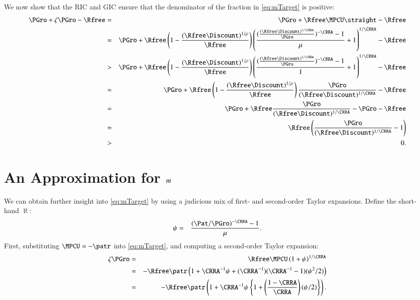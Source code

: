 We now show that the RIC and GIC ensure that the denominator of the fraction in \eqref{eq:mTarget} is positive:
\begin{eqnarray*}
\PGro + \zeta \PGro - \Rfree & = & \PGro + \Rfree \MPCU \straight - \Rfree
 \\& = & \PGro + \Rfree \left(1- \frac{(\Rfree \Discount)^{1/\rho}}{\Rfree}\right) \left(\frac{(\frac{(\Rfree\Discount)^{1/\CRRA}}{\PGro})^{-\CRRA}-1}{\urate}+1\right)^{1/\CRRA}-\Rfree
 \\& > &  \PGro+\Rfree \left(1-\frac{(\Rfree\Discount)^{1/\rho}}{\Rfree}\right)
\left(\frac{(\frac{(\Rfree\Discount)^{1/\CRRA}}{\PGro})^{-\CRRA}-1}{1}+1\right)^{1/\CRRA}-\Rfree
 \\& = & \PGro+\Rfree\left(1-\frac{(\Rfree\Discount)^{1/\rho}}{\Rfree}\right)\frac{\PGro}{(\Rfree\Discount)^{1/\CRRA}}-\Rfree
 \\& = & \PGro+\Rfree \frac{\PGro}{(\Rfree\Discount)^{1/\CRRA}}- \PGro - \Rfree
 \\& = & \Rfree \left(\frac{\PGro}{(\Rfree\Discount)^{1/\CRRA}}-1\right)
 \\& > & 0.
\end{eqnarray*}


\section{An Approximation for $\mTarg^{\null}$}
We can obtain further insight into \eqref{eq:mTarget} by using a judicious mix of first- and second-order Taylor expansions. Define the short-hand $\aleph$:
\begin{eqnarray*}
\aleph & = & \frac{(\Pat/\PGro)^{-\CRRA} - 1}{\urate}%
.
\end{eqnarray*}
First, substituting $\MPCU = -\patr$ into \eqref{eq:mTarget}, and computing a second-order Taylor expansion:
\begin{eqnarray}
  \label{eq:zetaExp}
  \zeta\PGro & = & \Rfree \MPCU \left(1+\aleph\right)^{1/\CRRA} \notag
\\ & \approx & -\Rfree \patr \left(1+\CRRA^{-1}\aleph+(\CRRA^{-1})(\CRRA^{-1}-1)(\aleph^{2}/2)\right) \notag
\\ & = & -\Rfree \patr \left(1+\CRRA^{-1}\aleph\left\{1+\left(\frac{1-\CRRA}{\CRRA}\right)(\aleph/2)\right\}\right)
. \label{eq:zetaTaylor2}
\end{eqnarray}

